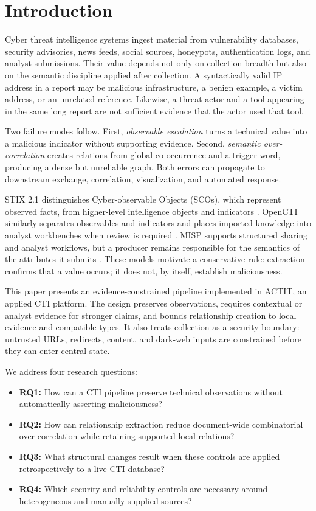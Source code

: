 \documentclass[conference]{IEEEtran}
\begin{document}
\section{Introduction}
Cyber threat intelligence systems ingest material from vulnerability databases, security advisories, news feeds, social sources, honeypots, authentication logs, and analyst submissions. Their value depends not only on collection breadth but also on the semantic discipline applied after collection. A syntactically valid IP address in a report may be malicious infrastructure, a benign example, a victim address, or an unrelated reference. Likewise, a threat actor and a tool appearing in the same long report are not sufficient evidence that the actor used that tool.

Two failure modes follow. First, \emph{observable escalation} turns a technical value into a malicious indicator without supporting evidence. Second, \emph{semantic over-correlation} creates relations from global co-occurrence and a trigger word, producing a dense but unreliable graph. Both errors can propagate to downstream exchange, correlation, visualization, and automated response.

STIX 2.1 distinguishes Cyber-observable Objects (SCOs), which represent observed facts, from higher-level intelligence objects and indicators \cite{oasis2021stix}. OpenCTI similarly separates observables and indicators and places imported knowledge into analyst workbenches when review is required \cite{openctiObservables,openctiWorkbench}. MISP supports structured sharing and analyst workflows, but a producer remains responsible for the semantics of the attributes it submits \cite{mispProject}. These models motivate a conservative rule: extraction confirms that a value occurs; it does not, by itself, establish maliciousness.

This paper presents an evidence-constrained pipeline implemented in ACTIT, an applied CTI platform. The design preserves observations, requires contextual or analyst evidence for stronger claims, and bounds relationship creation to local evidence and compatible types. It also treats collection as a security boundary: untrusted URLs, redirects, content, and dark-web inputs are constrained before they can enter central state.

We address four research questions:

\begin{itemize}
  \item \textbf{RQ1:} How can a CTI pipeline preserve technical observations without automatically asserting maliciousness?
  \item \textbf{RQ2:} How can relationship extraction reduce document-wide combinatorial over-correlation while retaining supported local relations?
  \item \textbf{RQ3:} What structural changes result when these controls are applied retrospectively to a live CTI database?
  \item \textbf{RQ4:} Which security and reliability controls are necessary around heterogeneous and manually supplied sources?
\end{itemize}
\end{document}
